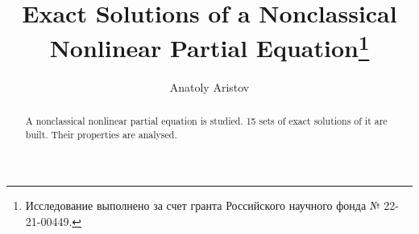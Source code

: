 \begin{englishtitle}
\title{Exact Solutions of a Nonclassical Nonlinear Partial Equation\thanks{Исследование выполнено за счет гранта Российского научного фонда № 22-21-00449.}}
\author{Anatoly Aristov}

\maketitle

\begin{abstract}
A nonclassical nonlinear partial equation is studied. 15 sets of exact solutions of it are built. Their properties are analysed.

\end{abstract}
\end{englishtitle}

\iffalse
\documentclass[12pt]{llncs}  %

\usepackage[T2A]{fontenc}
\usepackage[cp1251]{inputenc} %
\usepackage[english,russian]{babel}




\usepackage{todonotes} %

\usepackage[russian]{nla}

